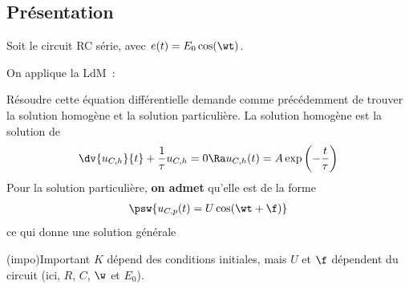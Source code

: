 \documentclass[../../main/main.tex]{subfiles}
\begin{document}
\subsection{Présentation}
\noindent
\begin{minipage}[t]{.45\linewidth}
	Soit le circuit RC série, avec $e(t) = E_0\cos(\wt)$.
	\begin{center}
	\end{center}
\end{minipage}
\hfill
\begin{minipage}[t]{.5\linewidth}
	On applique la LdM~:
\end{minipage}
\bigbreak
Résoudre cette équation différentielle demande comme précédemment de trouver la
solution homogène et la solution particulière. La solution homogène est la
solution de
\begin{gather*}
	\dv{u_{C,h}}{t} + \frac{1}{\tau}u_{C,h} = 0
	\Ra
	u_{C,h}(t) = A\exp \left( - \frac{t}{\tau} \right)
\end{gather*}
Pour la solution particulière, \textbf{on admet} qu'elle est de la forme
\begin{gather*}
	\psw{
		u_{C,p}(t) = U\cos(\wt + \f)
	}
\end{gather*}
ce qui donne une solution générale
\psw{
	\[\boxed{u_C(t) = A\exp \left( - \frac{t}{\tau} \right) + U\cos(\wt + \f)}\]
}
\vspace{-15pt}
\begin{tcb}[label=ror:CIounon](impo){Important}
	$K$ dépend des conditions initiales, mais
	\smallbreak \centering\large
	$U$ et $\f$ dépendent du circuit (ici, $R$, $C$, $\w$ et $E_0$).
\end{tcb}
\end{document}
